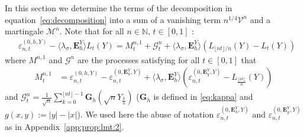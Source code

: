 \documentclass[12pt]{article}
\numberwithin{equation}{section}
\theoremstyle{definition}
\theoremstyle{remark}
\newcommand{\NN}{\mathbb{N}}
\newcommand{\cG}{\mathcal{G}}
\newcommand{\bfH}[1]{\mathbf{E}^Y_{#1}}
\newcommand{\bfG}[1]{\mathbf{G}_{#1}}
\begin{document}
In this section we determine the terms of the decomposition in equation~\eqref{eq:decomposition} into a sum of a vanishing term $n^{1/4}\mathcal{V}^n$ and a martingale $\mathcal{M}^n$.
%
Note that  for all $n\in \NN$, $t\in [0,1]$ :
\begin{equation} 
\begin{split}
	& \varepsilon_{n,t}^{(0,h,Y)}  - \langle \lambda_\sigma , \bfH h \rangle L_t(Y)
	 =		 
	M^{n,1}_t + \cG^n_t + \langle \lambda_\sigma , \bfH h \rangle \left(  L_{\lfloor n t \rfloor/n}(Y) - L_t(Y) \right)
\end{split}
\end{equation}
%
where $M^{n,1}$ and $\cG^n$ are the processes satisfying for all $t\in [0,1]$ that
\begin{equation}  
\begin{split}
	M^{n,1}_t 
	& = \varepsilon_{n,t}^{(0,h,Y)} - \varepsilon_{n,t}^{(0,\bfH h,Y)} + \langle \lambda_\sigma , \bfH h \rangle \left(  \varepsilon_{n,t}^{(0,\bfH g,Y)}	- L_{\frac{\lfloor n t \rfloor}n}(Y)\right)
\end{split}
\end{equation}
and 
$
	\cG^n_t =  \frac1{\sqrt{n}} \sum_{k=0}^{\lfloor n t \rfloor-1} \bfG{h}( \sqrt{n} Y_{\frac{k}n})	
$ 
($\bfG{h}$ is defined in \eqref{eq:kappa} and $g(x,y) := |y| - |x| $).
We used here the abuse of notation $\varepsilon_{n,t}^{(0,\bfH h,Y)}$ and $\varepsilon_{n,t}^{(0,\bfH g,Y)}$ as in Appendix~\ref{app:prop:lmt:2}.
%
%
%
\end{document}
